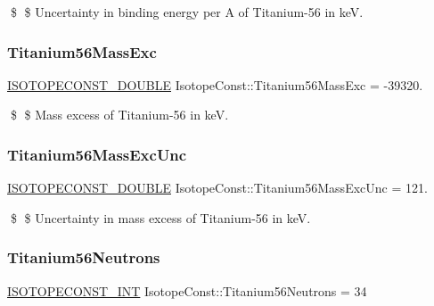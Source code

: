 \$ \$ Uncertainty in binding energy per A of Titanium-\/56 in keV. \mbox{\label{group___isotope_const-_titanium-_ti56_ga93fc102713ad53987ba17346424a6d40}} 
\subsubsection{\texorpdfstring{Titanium56\+Mass\+Exc}{Titanium56MassExc}}
{\footnotesize\ttfamily \mbox{\hyperlink{group___isotope_const-_macros_ga8f45a7272ce02c0b4c65c44636ed719a}{I\+S\+O\+T\+O\+P\+E\+C\+O\+N\+S\+T\+\_\+\+D\+O\+U\+B\+LE}} Isotope\+Const\+::\+Titanium56\+Mass\+Exc = -\/39320.}

\$ \$ Mass excess of Titanium-\/56 in keV. \mbox{\label{group___isotope_const-_titanium-_ti56_ga1aa65fd412a17cbcca2728aa507063ce}} 
\subsubsection{\texorpdfstring{Titanium56\+Mass\+Exc\+Unc}{Titanium56MassExcUnc}}
{\footnotesize\ttfamily \mbox{\hyperlink{group___isotope_const-_macros_ga8f45a7272ce02c0b4c65c44636ed719a}{I\+S\+O\+T\+O\+P\+E\+C\+O\+N\+S\+T\+\_\+\+D\+O\+U\+B\+LE}} Isotope\+Const\+::\+Titanium56\+Mass\+Exc\+Unc = 121.}

\$ \$ Uncertainty in mass excess of Titanium-\/56 in keV. \mbox{\label{group___isotope_const-_titanium-_ti56_ga70e68827f6d0f960cc6df82e3f861377}} 
\subsubsection{\texorpdfstring{Titanium56\+Neutrons}{Titanium56Neutrons}}
{\footnotesize\ttfamily \mbox{\hyperlink{group___isotope_const-_macros_ga5f18360b3e99483a35c32d789e62621c}{I\+S\+O\+T\+O\+P\+E\+C\+O\+N\+S\+T\+\_\+\+I\+NT}} Isotope\+Const\+::\+Titanium56\+Neutrons = 34}

